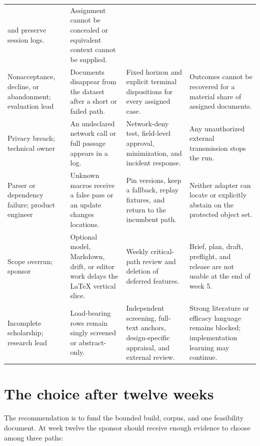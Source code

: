 \begin{longtable}{@{}>{\raggedright\arraybackslash}p{}
>{\raggedright\arraybackslash}p{}
>{\raggedright\arraybackslash}p{}
>{\raggedright\arraybackslash}p{}@{}}
and preserve session logs. & Assignment cannot be concealed or equivalent
context cannot be supplied. \\
Nonacceptance, decline, or abandonment; evaluation lead & Documents disappear
from the dataset after a short or failed path. & Fixed horizon and explicit
terminal dispositions for every assigned case. & Outcomes cannot be recovered
for a material share of assigned documents. \\
Privacy breach; technical owner & An undeclared network call or full passage
appears in a log. & Network-deny test, field-level approval, minimization, and
incident response. & Any unauthorized external transmission stops the run. \\
Parser or dependency failure; product engineer & Unknown macros receive a
false pass or an update changes locations. & Pin versions, keep a fallback,
replay fixtures, and return to the incumbent path. & Neither adapter can locate
or explicitly abstain on the protected object set. \\
Scope overrun; sponsor & Optional model, Markdown, drift, or editor work delays
the LaTeX vertical slice. & Weekly critical-path review and deletion of deferred
features. & Brief, plan, draft, preflight, and release are not usable at the end
of week 5. \\
Incomplete scholarship; research lead & Load-bearing rows remain singly
screened or abstract-only. & Independent screening, full-text anchors,
design-specific appraisal, and external review. & Strong literature or
efficacy language remains blocked; implementation learning may continue. \\
\bottomrule
\end{longtable}

\section{The choice after twelve weeks}

The recommendation is to fund the bounded build, corpus, and one feasibility
document. At week twelve the sponsor should receive enough evidence to choose
among three paths:

